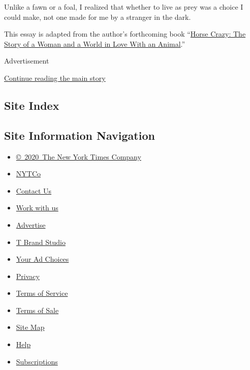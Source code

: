 Unlike a fawn or a foal, I realized that whether to live as prey was a
choice I could make, not one made for me by a stranger in the dark.

This essay is adapted from the author's forthcoming book
``\href{https://www.simonandschuster.com/books/Horse-Crazy/Sarah-Maslin-Nir/9781501196232}{Horse
Crazy: The Story of a Woman and a World in Love With an Animal}.''

Advertisement

\protect\hyperlink{after-bottom}{Continue reading the main story}

\hypertarget{site-index}{%
\subsection{Site Index}\label{site-index}}

\hypertarget{site-information-navigation}{%
\subsection{Site Information
Navigation}\label{site-information-navigation}}

\begin{itemize}
\tightlist
\item
  \href{https://help.nytimes.com/hc/en-us/articles/115014792127-Copyright-notice}{©~2020~The
  New York Times Company}
\end{itemize}

\begin{itemize}
\tightlist
\item
  \href{https://www.nytco.com/}{NYTCo}
\item
  \href{https://help.nytimes.com/hc/en-us/articles/115015385887-Contact-Us}{Contact
  Us}
\item
  \href{https://www.nytco.com/careers/}{Work with us}
\item
  \href{https://nytmediakit.com/}{Advertise}
\item
  \href{http://www.tbrandstudio.com/}{T Brand Studio}
\item
  \href{https://www.nytimes.com/privacy/cookie-policy\#how-do-i-manage-trackers}{Your
  Ad Choices}
\item
  \href{https://www.nytimes.com/privacy}{Privacy}
\item
  \href{https://help.nytimes.com/hc/en-us/articles/115014893428-Terms-of-service}{Terms
  of Service}
\item
  \href{https://help.nytimes.com/hc/en-us/articles/115014893968-Terms-of-sale}{Terms
  of Sale}
\item
  \href{https://spiderbites.nytimes.com}{Site Map}
\item
  \href{https://help.nytimes.com/hc/en-us}{Help}
\item
  \href{https://www.nytimes.com/subscription?campaignId=37WXW}{Subscriptions}
\end{itemize}
